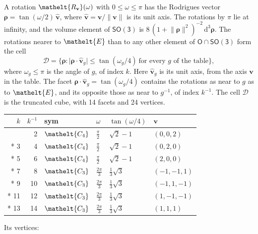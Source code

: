 \documentclass[10pt,a4paper]{article}
\numberwithin{equation}{section}
\newcommand{\eltfont}[1]{{\let\sigma\eltsigma\mathelt{#1}}}
\newcommand{\grp}[1]{\mathsf{#1}}
\newcommand{\cls}[1]{\eltfont{#1}}
\newcommand{\elt}[1]{\eltfont{#1}}
\newcommand{\dirvec}[3]{(#1, #2, #3)}
\newcommand{\unitaxis}{\hat{\mathbf{v}}}
\newcommand{\vv}{\mathbf{v}}
\newcommand{\diff}{\mathrm{d}}
\newcommand{\rodrigues}{\boldsymbol{\rho}}
\newcommand{\fcell}{\mathcal{D}}
\begin{document}
\leavevmode\label{n:vector.rodrigues}\label{n:vector.unitaxis}A rotation $\elt{R_{\vv}}(\omega)$ with $0 \le \omega \le \pi$ has the Rodrigues vector $\rodrigues = \tan(\omega/2)\,\unitaxis$, where $\unitaxis = \vv/\lVert\vv\rVert$ is its unit axis. The rotations by $\pi$ lie at infinity, and the volume element of \href{SO3.pdf}{$\grp{SO(3)}$} is $8\,(1 + \lVert\rodrigues\rVert^2)^{-2}\,\diff^3\rodrigues$.
\leavevmode\label{n:set.cell}The rotations nearer to $\elt{E}$ than to any other element of $\grp{O} \cap \grp{SO(3)}$ form the cell
\begin{equation}\label{e:cell}\fcell = \bigl\{\rodrigues : \lvert\rodrigues\cdot\unitaxis_g\rvert \le \tan(\omega_g/4)\ \text{for every $g$ of the table}\bigr\},\end{equation}
where $\omega_g \le \pi$ is the angle of $g$, of index $k$. Here $\unitaxis_g$ is its unit axis, from the axis $\vv$ in the table. The facet $\rodrigues\cdot\unitaxis_g = \tan(\omega_g/4)$ contains the rotations as near to $g$ as to $\elt{E}$, and its opposite those as near to $g^{-1}$, of index $k^{-1}$. The cell $\fcell$ is the truncated cube, with 14 facets and 24 vertices.
{\small{\renewcommand{\arraystretch}{1.3}\begin{longtable}{@{}rrllll@{}}\toprule
$k$ & $k^{-1}$ & sym & $\omega$ & $\tan(\omega/4)$ & $\vv$\\\midrule\endhead
\bottomrule\endfoot\endlastfoot
1 & 2 & $\cls{C_{4}}$ & $\tfrac{\pi}{2}$ & $\sqrt{2} - 1$ & $\dirvec{0}{0}{2}$\\*
3 & 4 & $\cls{C_{4}}$ & $\tfrac{\pi}{2}$ & $\sqrt{2} - 1$ & $\dirvec{0}{2}{0}$\\*
5 & 6 & $\cls{C_{4}}$ & $\tfrac{\pi}{2}$ & $\sqrt{2} - 1$ & $\dirvec{2}{0}{0}$\\*
7 & 8 & $\cls{C_{3}}$ & $\tfrac{2\pi}{3}$ & $\tfrac{1}{3}\sqrt{3}$ & $\dirvec{-1}{-1}{1}$\\*
9 & 10 & $\cls{C_{3}}$ & $\tfrac{2\pi}{3}$ & $\tfrac{1}{3}\sqrt{3}$ & $\dirvec{-1}{1}{-1}$\\*
11 & 12 & $\cls{C_{3}}$ & $\tfrac{2\pi}{3}$ & $\tfrac{1}{3}\sqrt{3}$ & $\dirvec{1}{-1}{-1}$\\*
13 & 14 & $\cls{C_{3}}$ & $\tfrac{2\pi}{3}$ & $\tfrac{1}{3}\sqrt{3}$ & $\dirvec{1}{1}{1}$\\
\bottomrule\end{longtable}}}
\leavevmode\label{n:head.vertex}Its vertices:
\end{document}
